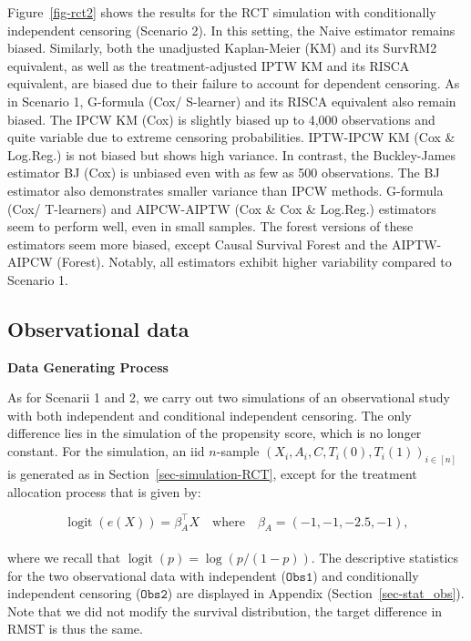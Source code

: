 \documentclass[
  11pt,
  a4paper,
]{article}
\theoremstyle{plain}
\theoremstyle{plain}
\theoremstyle{plain}
\theoremstyle{definition}
\theoremstyle{remark}
\begin{document}
Figure~\ref{fig-rct2} shows the results for the RCT simulation with
conditionally independent censoring (Scenario 2). In this setting, the
Naive estimator remains biased. Similarly, both the unadjusted
Kaplan-Meier (KM) and its SurvRM2 equivalent, as well as the
treatment-adjusted IPTW KM and its RISCA equivalent, are biased due to
their failure to account for dependent censoring. As in Scenario 1,
G-formula (Cox/ S-learner) and its RISCA equivalent also remain biased.
The IPCW KM (Cox) is slightly biased up to 4,000 observations and quite
variable due to extreme censoring probabilities. IPTW-IPCW KM (Cox \&
Log.Reg.) is not biased but shows high variance. In contrast, the
Buckley-James estimator BJ (Cox) is unbiased even with as few as 500
observations. The BJ estimator also demonstrates smaller variance than
IPCW methods. G-formula (Cox/ T-learners) and AIPCW-AIPTW (Cox \& Cox \&
Log.Reg.) estimators seem to perform well, even in small samples. The
forest versions of these estimators seem more biased, except Causal
Survival Forest and the AIPTW-AIPCW (Forest). Notably, all estimators
exhibit higher variability compared to Scenario 1.

\subsection{Observational data}\label{sec-simulation-Obs}

\textbf{Data Generating Process}

As for Scenarii 1 and 2, we carry out two simulations of an
observational study with both independent and conditional independent
censoring. The only difference lies in the simulation of the propensity
score, which is no longer constant. For the simulation, an iid
\(n\)-sample \((X_{i},A_{i},C,T_{i}(0), T_{i}(1))_{i \in [n]}\) is
generated as in Section~\ref{sec-simulation-RCT}, except for the
treatment allocation process that is given by:

\[
\operatorname{logit}(e(X))= \beta_A^\top X \quad \text{where} \quad \beta_A = (-1,-1,-2.5,-1),
\]\\
where we recall that \(\operatorname{logit}(p) = \log(p/(1-p))\). The
descriptive statistics for the two observational data with independent
(\(\texttt{Obs1}\)) and conditionally independent censoring
(\(\texttt{Obs2}\)) are displayed in Appendix
(Section~\ref{sec-stat_obs}). Note that we did not modify the survival
distribution, the target difference in RMST is thus the same.
\end{document}
